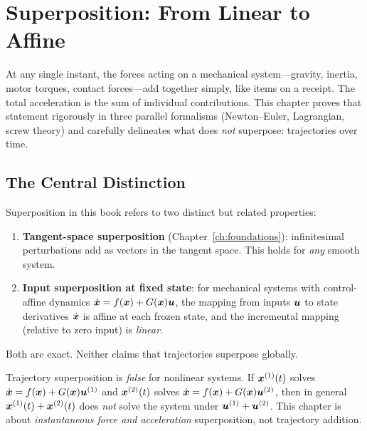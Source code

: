 \chapter{Superposition: From Linear to Affine}
\label{ch:superposition}

\begin{laymansbox}
At any single instant, the forces acting on a mechanical system---gravity, inertia,
motor torques, contact forces---add together simply, like items on a receipt. The total
acceleration is the sum of individual contributions. This chapter proves that statement
rigorously in three parallel formalisms (Newton--Euler, Lagrangian, screw theory) and
carefully delineates what does \emph{not} superpose: trajectories over time.
\end{laymansbox}

\section{The Central Distinction}

Superposition in this book refers to two distinct but related properties:

\begin{enumerate}
\item \textbf{Tangent-space superposition} (Chapter~\ref{ch:foundations}):
infinitesimal perturbations add as vectors in the tangent space. This holds for
\emph{any} smooth system.

\item \textbf{Input superposition at fixed state}: for mechanical systems with
control-affine dynamics $\dot{\bm{x}} = f(\bm{x}) + G(\bm{x})\bm{u}$, the mapping from inputs
$\bm{u}$ to state derivatives $\dot{\bm{x}}$ is affine at each frozen state, and the
incremental mapping (relative to zero input) is \emph{linear}.
\end{enumerate}

Both are exact. Neither claims that trajectories superpose globally.

\begin{warningbox}
Trajectory superposition is \emph{false} for nonlinear systems. If $\bm{x}^{(1)}(t)$
solves $\dot{\bm{x}} = f(\bm{x})+G(\bm{x})\bm{u}^{(1)}$ and $\bm{x}^{(2)}(t)$ solves
$\dot{\bm{x}} = f(\bm{x})+G(\bm{x})\bm{u}^{(2)}$, then in general
$\bm{x}^{(1)}(t)+\bm{x}^{(2)}(t)$ does \emph{not} solve the system under
$\bm{u}^{(1)}+\bm{u}^{(2)}$. This chapter is about \emph{instantaneous force and
acceleration} superposition, not trajectory addition.
\end{warningbox}


